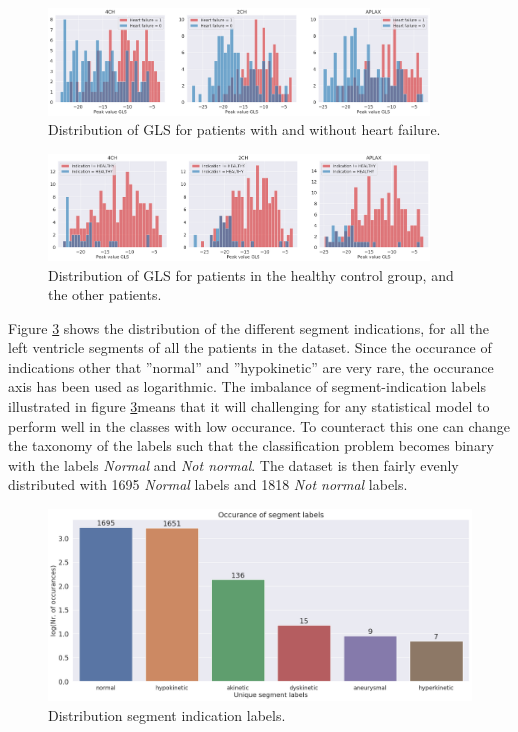 \begin{figure}[h]
    \begin{center}
    \includegraphics[width=0.9\textwidth]{data-exp/gls_hf_dist.png}
    \end{center}
    \caption{Distribution of GLS for patients with and without heart failure.}
    \label{fig:gls_hf_dist}
\end{figure}

\begin{figure}[!h]
    \begin{center}
    \includegraphics[width=0.9\textwidth]{data-exp/gls_indication_dist.png}
    \end{center}
    \caption{Distribution of GLS for patients in the healthy control group, and the other patients.}
    \label{fig:gls_ind_dist}
\end{figure}

\newpage

Figure \ref{fig:segm_label_dist} shows the distribution of the different segment indications, for all the left ventricle segments of all the patients in the dataset. Since the occurance of indications other that ''normal'' and ''hypokinetic'' are very rare, the occurance axis has been used as logarithmic. The imbalance of segment-indication labels illustrated in figure \ref{fig:segm_label_dist}means that it will challenging for any statistical model to perform well in the classes with low occurance. To counteract this one can change the taxonomy of the labels such that the classification problem becomes binary with the labels \textit{Normal} and \textit{Not normal}. The dataset is then fairly evenly distributed with 1695 \textit{Normal} labels and 1818 \textit{Not normal} labels.
\bigskip

\begin{figure}[!h]
    \begin{center}
    \includegraphics[width=\textwidth]{data-exp/segment_label_distribution.png}
    \end{center}
    \caption{Distribution segment indication labels.}
    \label{fig:segm_label_dist}
\end{figure}

